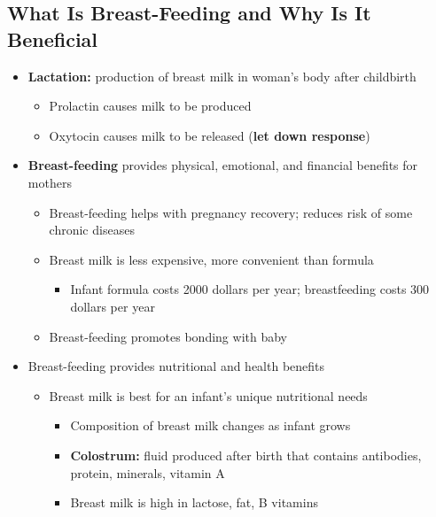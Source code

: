 \documentclass[12pt]{article}
\begin{document}
        \subsection{What Is Breast-Feeding and Why Is It Beneficial}
            \begin{itemize}
                \item \textbf{Lactation:} production of breast milk in woman's body after childbirth
                    \begin{itemize}
                        \item Prolactin causes milk to be produced
                        \item Oxytocin causes milk to be released (\textbf{let down response})
                    \end{itemize}
                \item \textbf{Breast-feeding} provides physical, emotional, and financial benefits for mothers
                    \begin{itemize}
                        \item Breast-feeding helps with pregnancy recovery; reduces risk of some chronic diseases
                        \item Breast milk is less expensive, more convenient than formula
                            \begin{itemize}
                                \item Infant formula costs 2000 dollars per year; breastfeeding costs 300 dollars per year
                            \end{itemize}
                        \item Breast-feeding promotes bonding with baby
                    \end{itemize}
                \item Breast-feeding provides nutritional and health benefits
                    \begin{itemize}
                        \item Breast milk is best for an infant's unique nutritional needs
                            \begin{itemize}
                                \item Composition of breast milk changes as infant grows
                                \item \textbf{Colostrum:} fluid produced after birth that contains antibodies, protein, minerals, vitamin A
                                \item Breast milk is high in lactose, fat, B vitamins

\end{itemize}
\end{itemize}
\end{itemize}
\end{document}

